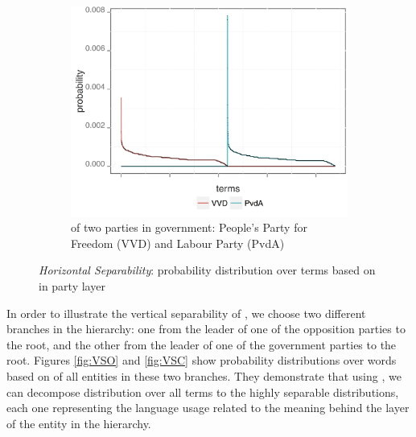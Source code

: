 \begin{figure}[!t]
\begin{subfigure}[b]{0.32\textwidth}
        \end{subfigure}
        ~ 
        \begin{subfigure}[b]{0.32\textwidth}
\centering
\includegraphics[width=\linewidth]{02-part-01/chapter-03/figs_and_tables/img_VVD-PvdA.png}
\caption{\label{fig:HSPCC} \achswlm of two parties in government: People's Party for Freedom (VVD) and Labour Party (PvdA)}
        \end{subfigure}
        \caption{\label{fig:HSP-pairs} \emph{Horizontal Separability}: probability distribution over terms based on \hswlms in party layer}
\end{figure}

In order to illustrate the vertical separability of \achswlm, we choose two different branches in the hierarchy: one from the leader of one of the opposition parties to the root, and the other from the leader of one of the government parties to the root. Figures \ref{fig:VSO} and \ref{fig:VSC} show probability distributions over words based on \achswlm of all entities in these two branches. They demonstrate that using \achswlm, we can decompose distribution over all terms to the highly separable distributions, each one representing the language usage related to the meaning behind the layer of the entity in the hierarchy. 

